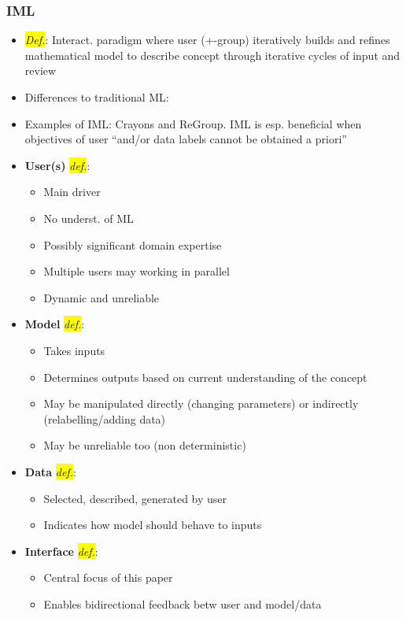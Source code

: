 \documentclass[12pt,a4paper]{article}
\begin{document}
\subsubsection{IML}
\begin{itemize}
\item \colorbox{yellow}{\textit{Def.}}: Interact. paradigm where user (+-group) iteratively builds and refines mathematical model to describe concept through iterative cycles of input and review
\item Differences to traditional ML:
\item Examples of IML: Crayons and ReGroup. IML is esp. beneficial when objectives of user ``and/or data labels cannot be obtained a priori''
\item \textbf{User(s)} \colorbox{yellow}{\textit{def.}}: \begin{itemize}
\item Main driver
\item No underst. of ML
\item Possibly significant domain expertise 
\item Multiple users may working in parallel
\item Dynamic and unreliable
\end{itemize}
\item \textbf{Model} \colorbox{yellow}{\textit{def.}}: \begin{itemize}
\item Takes inputs
\item Determines outputs based on current understanding of the concept
\item May be manipulated directly (changing parameters) or indirectly (relabelling/adding data)
\item May be unreliable too (non deterministic)
\end{itemize}
\item \textbf{Data} \colorbox{yellow}{\textit{def.}}: \begin{itemize}
\item Selected, described, generated by user
\item Indicates how model should behave to inputs
\end{itemize}
\item \textbf{Interface} \colorbox{yellow}{\textit{def.}}: \begin{itemize}
\item Central focus of this paper
\item Enables bidirectional feedback betw user and model/data
\end{itemize}
\end{itemize}
\end{document}
